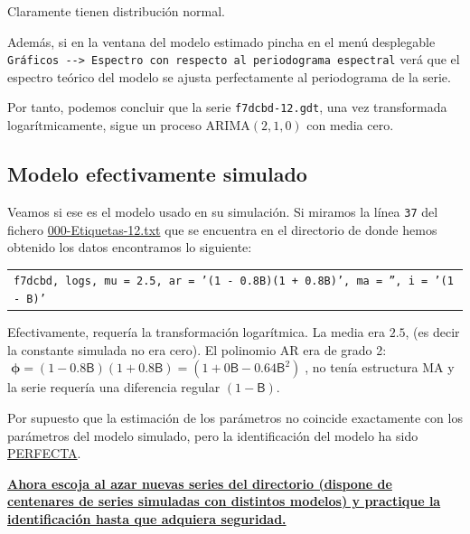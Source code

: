 \documentclass[10pt]{article}
\begin{document}
Claramente tienen distribución normal.
\medskip



Además, si en la ventana del modelo estimado pincha en el menú
desplegable \texttt{Gráficos -{}-{}> Espectro con respecto al periodograma
espectral} verá que el espectro teórico del modelo se ajusta
perfectamente al periodograma de la serie.
\medskip

Por tanto, podemos concluir que la serie \texttt{f7dcbd-12.gdt}, una vez
transformada logarítmicamente, sigue un proceso ARIMA\((2,1,0)\) con
media cero. 
\subsection*{Modelo efectivamente simulado}
\label{sec:orgd192533}

Veamos si ese es el modelo usado en su simulación. Si miramos la línea
\texttt{37} del fichero \href{IdentificaEstosARIMA/000-Etiquetas-12.txt}{000-Etiquetas-12.txt} que se encuentra en el directorio de
donde hemos obtenido los datos encontramos lo siguiente:
\medskip

\begin{center}
\begin{tabular}{l}
\texttt{f7dcbd,	logs,	mu = 2.5,	ar = '(1 - 0.8B)(1 + 0.8B)', ma = '', i = '(1 - B)'}\\
\end{tabular}
\end{center}

\medskip

Efectivamente, requería la transformación logarítmica. La media era
\(2.5\), (es decir la constante simulada no era cero). El polinomio AR
era de grado 2: \(\;\boldsymbol{\phi}=(1 - 0.8\mathsf{B})(1 +
0.8\mathsf{B})=(1+0\mathsf{B}-0.64\mathsf{B}^2)\;\), no tenía
estructura MA y la serie requería una diferencia regular \((1 -
\mathsf{B})\).
\bigskip

Por supuesto que la estimación de los parámetros no coincide
exactamente con los parámetros del modelo simulado, pero la
identificación del modelo ha sido \uline{PERFECTA}.
\bigskip


\textbf{\uline{Ahora escoja al azar nuevas series del \href{https://github.com/mbujosab/EconometriaAplicada-SRC/tree/main/Ejercicios/IdentificaEstosARIMA}{directorio} (dispone de
 centenares de series simuladas con distintos modelos) y practique la
 identificación hasta que adquiera seguridad.}}
\end{document}
